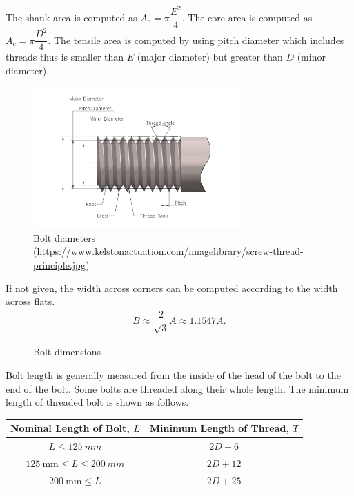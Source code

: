 The shank area is computed as $A_o=\pi\dfrac{E^2}{4}$. The core area is computed as $A_c=\pi\dfrac{D^2}{4}$. The tensile area is computed by using pitch diameter which includes threads thus is smaller than $E$ (major diameter) but greater than $D$ (minor diameter).
\begin{figure}[H]
\centering\includegraphics[width=8cm]{PIC/CH06/BDD}
\caption{Bolt diameters (\href{https://www.kelstonactuation.com/imagelibrary/screw-thread-principle.jpg}{\url{https://www.kelstonactuation.com/imagelibrary/screw-thread-principle.jpg}})}
\end{figure}

If not given, the width across corners can be computed according to the width across flats.
\begin{gather}
B\approx\dfrac{2}{\sqrt{3}}A\approx1.1547A.
\end{gather}
\begin{figure}[H]
\centering
\caption{Bolt dimensions}
\end{figure}

Bolt length is generally measured from the inside of the head of the bolt to the end of the bolt. Some bolts are threaded along their whole length. The minimum length of threaded bolt is shown as follows.
\begin{table}[H]
\centering\footnotesize
\begin{tabular}{cc}
	\toprule
	          Nominal Length of Bolt, $L$            & Minimum Length of Thread, $T$ \\ \midrule
	            $L\leqslant\SI{125}{mm}$             &            $2D+6$             \\
	$\SI{125}{\mm}\leqslant{}L\leqslant\SI{200}{mm}$ &            $2D+12$            \\
	          $\SI{200}{\mm}\leqslant{}L$            &            $2D+25$            \\ \bottomrule
\end{tabular}
\end{table}

